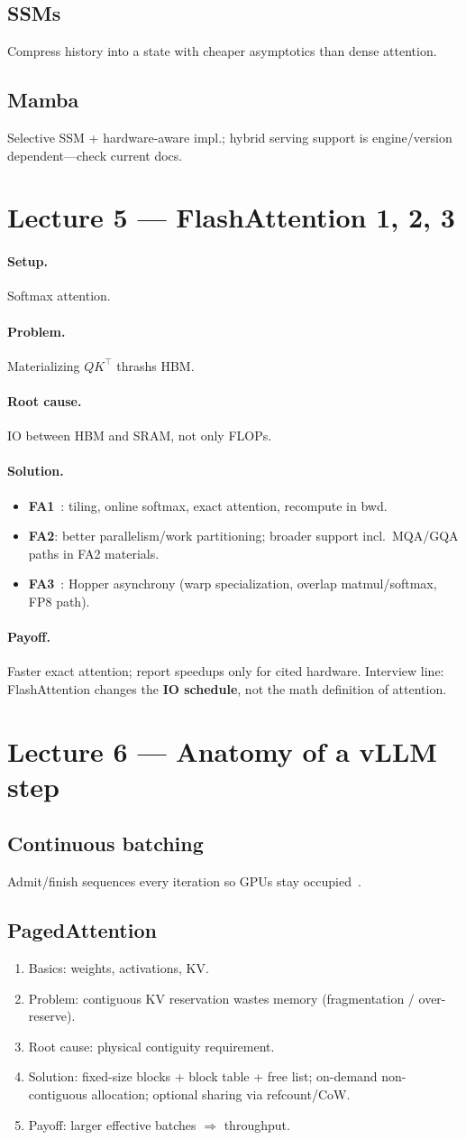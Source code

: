 \documentclass[11pt,a4paper]{article}
\newcommand{\setup}{\paragraph{Setup.}}
\newcommand{\problem}{\paragraph{Problem.}}
\newcommand{\rootcause}{\paragraph{Root cause.}}
\newcommand{\solution}{\paragraph{Solution.}}
\newcommand{\payoff}{\paragraph{Payoff.}}
\begin{document}
\subsection{SSMs}
Compress history into a state with cheaper asymptotics than dense attention.

\subsection{Mamba~\cite{gu2023mamba}}
Selective SSM + hardware-aware impl.; hybrid serving support is engine/version dependent---check current docs.

\section{Lecture 5 --- FlashAttention 1, 2, 3}
\setup Softmax attention.
\problem Materializing $QK^\top$ thrashs HBM.
\rootcause IO between HBM and SRAM, not only FLOPs.
\solution
\begin{itemize}[leftmargin=*]
\item \textbf{FA1}~\cite{dao2022flash}: tiling, online softmax, exact attention, recompute in bwd.
\item \textbf{FA2}: better parallelism/work partitioning; broader support incl.\ MQA/GQA paths in FA2 materials.
\item \textbf{FA3}~\cite{dao2024flash3}: Hopper asynchrony (warp specialization, overlap matmul/softmax, FP8 path).
\end{itemize}
\payoff Faster exact attention; report speedups only for cited hardware.
Interview line: FlashAttention changes the \textbf{IO schedule}, not the math definition of attention.

\section{Lecture 6 --- Anatomy of a vLLM step}
\subsection{Continuous batching}
Admit/finish sequences every iteration so GPUs stay occupied~\cite{kwon2023vllm}.

\subsection{PagedAttention~\cite{kwon2023vllm,vllmblog2023,vizuara-paged-yt}}
\begin{enumerate}[leftmargin=*]
\item Basics: weights, activations, KV.
\item Problem: contiguous KV reservation wastes memory (fragmentation / over-reserve).
\item Root cause: physical contiguity requirement.
\item Solution: fixed-size blocks + block table + free list; on-demand non-contiguous allocation; optional sharing via refcount/CoW.
\item Payoff: larger effective batches $\Rightarrow$ throughput.
\end{enumerate}
\end{document}
